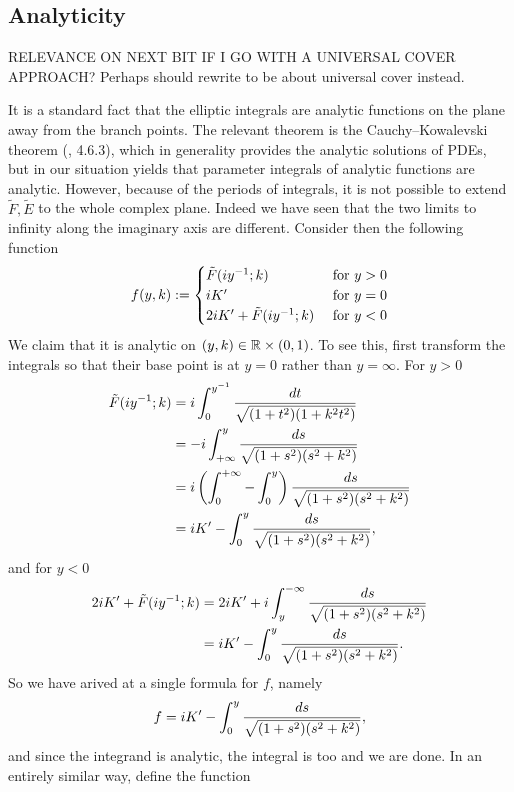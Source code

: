 \subsection{Analyticity}
\label{sub:Analyticity}

RELEVANCE ON NEXT BIT IF I GO WITH A UNIVERSAL COVER APPROACH?  Perhaps should rewrite to be about universal cover instead.

It is a standard fact that the elliptic integrals are analytic functions on the plane away from the branch points. The relevant theorem is the Cauchy–Kowalevski theorem (\cite{Evans1998}, 4.6.3), which in generality provides the analytic solutions of PDEs, but in our situation yields that parameter integrals of analytic functions are analytic. However, because of the periods of integrals, it is not possible to extend $\tilde F, \tilde E$ to the whole complex plane. Indeed we have seen that the two limits to infinity along the imaginary axis are different. Consider then the following function
\[
f(y, k) :=
\begin{cases}
\tilde F(i y^{-1}; k)             & \text{ for } y > 0 \\
i K'                              & \text{ for } y = 0 \\
2i K' + \tilde F(i y^{-1}; k)   & \text{ for } y < 0
\end{cases}
\]
We claim that it is analytic on $(y,k) \in \mathbb{R}\times (0,1)$. To see this, first transform the integrals so that their base point is at $y=0$ rather than $y=\infty$. For $y>0$
\begin{align*}
\tilde F(i y^{-1}; k)
&= i \int_0^{y^{-1}} \frac{dt}{\sqrt{(1+t^2)(1+k^2t^2)}} \\
&= -i \int_{+\infty}^{y} \frac{ds}{\sqrt{(1+s^2)(s^2+k^2)}} \\
&= i \left(\int_0^{+\infty} - \int_0^y \right) \frac{ds}{\sqrt{(1+s^2)(s^2+k^2)}} \\
&= i K' - \int_0^y \frac{ds}{\sqrt{(1+s^2)(s^2+k^2)}},
\end{align*}
and for $y < 0$
\begin{align*}
2i K' + \tilde F(i y^{-1}; k)
&= 2i K' + i \int_y^{-\infty} \frac{ds}{\sqrt{(1+s^2)(s^2+k^2)}} \\
&= i K' - \int_0^y \frac{ds}{\sqrt{(1+s^2)(s^2+k^2)}}.
\end{align*}
So we have arived at a single formula for $f$, namely
\[
f = i K' - \int_0^y \frac{ds}{\sqrt{(1+s^2)(s^2+k^2)}},
\]
and since the integrand is analytic, the integral is too and we are done. In an entirely similar way, define the function
